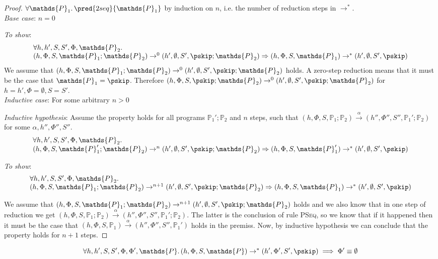 {\parindent0pt
\begin{proof}
$\forall \mathds{P}_1 \ldotp \pred{2seq}{\mathds{P}_1}$ by induction on $n$, i.e. the number of reduction steps in $\rightarrow^*$. \\

\textit{Base case}: $n = 0$

\textit{To show}:
\[
\begin{array}{l}
\forall h, h', S, S', \Phi, \mathds{P}_2 \ldotp \\ 
	(h, \Phi, S, \mathds{P}_1; \mathds{P}_2) \rightarrow^0 (h', \emptyset, S', \pskip; \mathds{P}_2)
	\Rightarrow
	(h, \Phi, S, \mathds{P}_1) \rightarrow^* (h', \emptyset, S', \pskip)
\end{array}
\]
We assume that $(h, \Phi, S, \mathds{P}_1; \mathds{P}_2) \rightarrow^0 (h', \emptyset, S', \pskip; \mathds{P}_2)$ holds. A zero-step reduction means that it must be the case that $\mathds{P}_1 = \pskip$. Therefore $(h, \Phi, S, \pskip; \mathds{P}_2) \rightarrow^0 (h', \emptyset, S', \pskip; \mathds{P}_2)$ for $h = h', \Phi = \emptyset, S = S'$. \\

\textit{Inductive case}: For some arbitrary $n > 0$

\textit{Inductive hypothesis}: Assume the property holds for all programs $\mathds{P}_1'; \mathds{P}_2$ and $n$ steps, such that $(h, \Phi, S, \mathds{P}_1; \mathds{P}_2) \xrightarrow{\alpha} (h'', \Phi'', S'', \mathds{P}_1'; \mathds{P}_2)$ for some $\alpha, h'', \Phi'', S''$.
\[
\begin{array}{l}
\forall h, h', S, S', \Phi, \mathds{P}_2 \ldotp \\ 
	(h, \Phi, S, \mathds{P}_1'; \mathds{P}_2) \rightarrow^n (h', \emptyset, S', \pskip; \mathds{P}_2)
	\Rightarrow
	(h, \Phi, S, \mathds{P}_1') \rightarrow^* (h', \emptyset, S', \pskip)
\end{array}
\]

\textit{To show}:
\[
\begin{array}{l}
\forall h, h', S, S', \Phi, \mathds{P}_2 \ldotp \\ 
	(h, \Phi, S, \mathds{P}_1; \mathds{P}_2) \rightarrow^{n+1} (h', \emptyset, S', \pskip; \mathds{P}_2)
	\Rightarrow
	(h, \Phi, S, \mathds{P}_1) \rightarrow^* (h', \emptyset, S', \pskip)
\end{array}
\]

We assume that $(h, \Phi, S, \mathds{P}_1; \mathds{P}_2) \rightarrow^{n+1} (h', \emptyset, S', \pskip; \mathds{P}_2)$ holds and we also know that in one step of reduction we get $(h, \Phi, S, \mathds{P}_1; \mathds{P}_2) \xrightarrow{\alpha} (h'', \Phi'', S'', \mathds{P}_1'; \mathds{P}_2)$. The latter is the conclusion of rule \textsc{PSeq}, so we know that if it happened then it must be the case that $(h, \Phi, S, \mathds{P}_1) \xrightarrow{\alpha} (h'', \Phi'', S'', \mathds{P}_1')$ holds in the premiss. Now, by inductive hypothesis we can conclude that the property holds for $n + 1$ steps.

\end{proof}
}

\lem \label{ref:phiemp}
\[
\forall h, h', S, S', \Phi, \Phi', \mathds{P} \ldotp
(h, \Phi, S, \mathds{P}) \rightarrow^* (h', \Phi', S', \pskip) \implies \Phi' \equiv \emptyset
\]